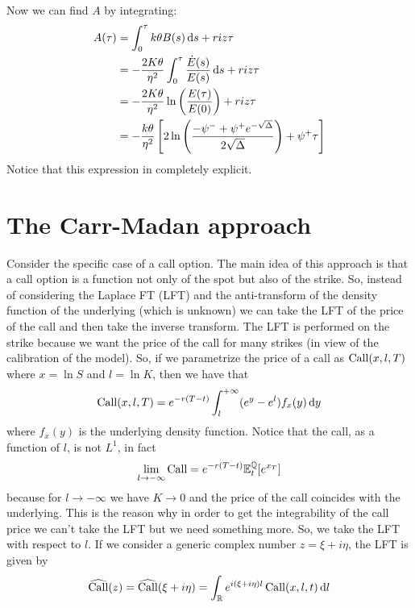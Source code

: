 Now we can find $A$ by integrating:
\begin{align}
    \notag A(\tau) &= \int_0^{\tau} k\theta B(s)\,\dd s + riz\tau \\
    &=
    \notag -\frac{2K\theta}{\eta^2} \int_0^{\tau} \frac{\dot{E}(s)}{E(s)}\,\dd s + riz\tau \\
    &=
    \notag -\frac{2K\theta}{\eta^2}\ln\left(\frac{E(\tau)}{E(0)}\right) + riz\tau \\
    &=
    -\frac{k\theta}{\eta^2}\left[2\ln\left(\frac{-\psi^- + \psi^+ e^{-\sqrt{\Delta}}}{2\sqrt{\Delta}}\right) + \psi^+\tau \right]
\end{align} %
Notice that this expression in completely explicit.

\section{The Carr-Madan approach}
Consider the specific case of a call option. The main idea of this approach is that a call option is a function not only of the spot but also of the strike. So, instead of considering the Laplace FT (LFT) and the anti-transform of the density function of the underlying (which is unknown) we can take the LFT of the price of the call and then take the inverse transform. The LFT is performed on the strike because we want the price of the call for many strikes (in view of the calibration of the model). So, if we parametrize the price of a call as $\operatorname{Call}(x,l,T)$ where $x = \ln S$ and $l = \ln K$, then we have that
\begin{equation}
    \operatorname{Call}(x,l,T) = e^{-r(T-t)}\int_{l}^{+\infty} (e^y - e^l)f_x(y)\,\dd y
\end{equation}
where $f_x(y)$ is the underlying density function. Notice that the call, as a function of $l$, is not $L^1$, in fact
\begin{equation*}
    \lim_{l\to-\infty}\operatorname{Call} = e^{-r(T-t)}\mathbb{E}^{\mathbb{Q}}_t[e^{x_T}]
\end{equation*}
because for $l\to-\infty$ we have $K\to0$ and the price of the call coincides with the underlying. This is the reason why in order to get the integrability of the call price we can't take the LFT but we need something more. So, we take the LFT with respect to $l$. If we consider a generic complex number $z = \xi + i\eta$, the LFT is given by
\begin{equation*}
    \widehat{\operatorname{Call}}(z) = \widehat{\operatorname{Call}}(\xi+i\eta) = \int_\mathbb{R} e^{i(\xi+i\eta)l}\operatorname{Call}(x,l,t)\,\dd l
\end{equation*}
